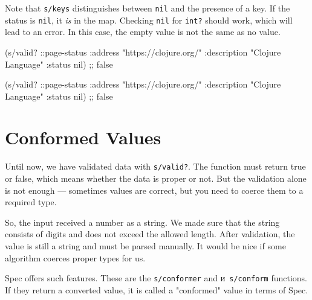 \fi


Note that \verb|s/keys| distinguishes between \verb|nil| and the presence of a key. If the status is \verb|nil|, it \emph{is} in the map. Checking \verb|nil| for \verb|int?| should work, which will lead to an error. In this case, the empty value is not the same as no value.

\ifx\DEVICETYPE\MOBILE

\begin{english}
  \begin{clojure}
(s/valid? ::page-status
  {:address "https://clojure.org/"
   :description "Clojure Language"
   :status nil})
;; false
  \end{clojure}
\end{english}

\else

\begin{english}
  \begin{clojure}
(s/valid? ::page-status
          {:address "https://clojure.org/"
           :description "Clojure Language"
           :status nil})
;; false
  \end{clojure}
\end{english}

\fi

\section{Conformed Values}

\label{spec-conform}


Until now, we have validated data with \verb|s/valid?|. The function must return true or false, which means whether the data is proper or not. But the validation alone is not enough — sometimes values are correct, but you need to coerce them to a required type.

So, the input received a number as a string. We made sure that the string consists of digits and does not exceed the allowed length. After validation, the value is still a string and must be parsed manually. It would be nice if some algorithm coerces proper types for us.


\mnoindent
Spec offers such features. These are the \verb|s/conformer| and и~\verb|s/conform| functions. If they return a converted value, it is called a "conformed" value in terms of Spec.

